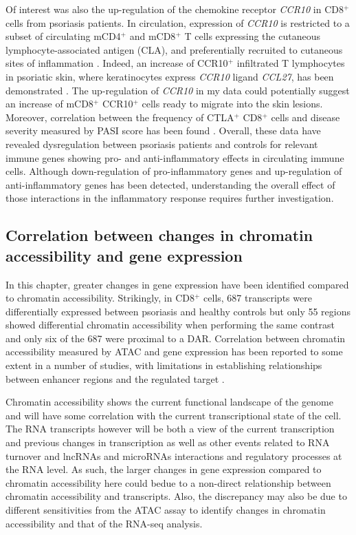 Of interest was also the up-regulation of the chemokine receptor \textit{CCR10} in CD8$^+$ cells from psoriasis patients. In circulation, expression of \textit{CCR10} is restricted to a subset of circulating mCD4$^+$ and mCD8$^+$ T cells expressing the cutaneous lymphocyte-associated antigen (CLA), and preferentially recruited to cutaneous sites of inflammation \parencite{Hudak2002}. Indeed, an increase of CCR10$^+$ infiltrated T lymphocytes in psoriatic skin, where keratinocytes express \textit{CCR10} ligand \textit{CCL27}, has been demonstrated \parencite{Homey2002}. The up-regulation of \textit{CCR10} in my data could potentially suggest an increase of mCD8$^+$ CCR10$^+$ cells ready to migrate into the skin lesions. Moreover, correlation between the frequency of CTLA$^+$ CD8$^+$ cells and disease severity measured by PASI score has been found \parencite{Sigmundsdottir2001}. Overall, these data have revealed dysregulation between psoriasis patients and controls for relevant immune genes showing pro- and anti-inflammatory effects in circulating immune cells. Although down-regulation of pro-inflammatory genes and up-regulation of anti-inflammatory genes has been detected, understanding the overall effect of those interactions in the inflammatory response requires further investigation. 




\subsection{Correlation between changes in chromatin accessibility and gene expression}
In this chapter, greater changes in gene expression have been identified compared to chromatin accessibility. Strikingly, in CD8$^+$ cells, 687 transcripts were differentially expressed between psoriasis and healthy controls but only 55 regions showed differential chromatin accessibility when performing the same contrast and only six of the 687 were proximal to a DAR. Correlation between chromatin accessibility measured by ATAC and gene expression has been reported to some extent in a number of studies, with limitations in establishing relationships between enhancer regions and the regulated target \parencite{Ackermann2016,Wang2018}.

Chromatin accessibility shows the current functional landscape of the genome and will have some correlation with the current transcriptional state of the cell. The RNA transcripts however will be both a view of the current transcription and previous changes in transcription as well as other events related to RNA turnover and lncRNAs and microRNAs interactions and regulatory processes at the RNA level. As such, the larger changes in gene expression compared to chromatin accessibility here could bedue to a non-direct relationship between chromatin accessibility and transcripts. Also, the discrepancy may also be due to different sensitivities from the ATAC assay to identify changes in chromatin accessibility and that of the RNA-seq analysis.

